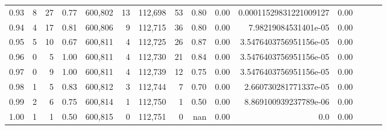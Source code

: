 \begin{tabular}{rrrrrrrrrrrrrrr}
0.93 &       8 &     27 &  0.77 &  600,802 &       13 &  112,698 &       53 &  0.80 &  0.00 &  0.00011529831221009127 &      0.00 \\
0.94 &       4 &     17 &  0.81 &  600,806 &        9 &  112,715 &       36 &  0.80 &  0.00 &    7.98219084531401e-05 &      0.00 \\
0.95 &       5 &     10 &  0.67 &  600,811 &        4 &  112,725 &       26 &  0.87 &  0.00 &  3.5476403756951156e-05 &      0.00 \\
0.96 &       0 &      5 &  1.00 &  600,811 &        4 &  112,730 &       21 &  0.84 &  0.00 &  3.5476403756951156e-05 &      0.00 \\
0.97 &       0 &      9 &  1.00 &  600,811 &        4 &  112,739 &       12 &  0.75 &  0.00 &  3.5476403756951156e-05 &      0.00 \\
0.98 &       1 &      5 &  0.83 &  600,812 &        3 &  112,744 &        7 &  0.70 &  0.00 &   2.660730281771337e-05 &      0.00 \\
0.99 &       2 &      6 &  0.75 &  600,814 &        1 &  112,750 &        1 &  0.50 &  0.00 &   8.869100939237789e-06 &      0.00 \\
1.00 &       1 &      1 &  0.50 &  600,815 &        0 &  112,751 &        0 &   nan &  0.00 &                     0.0 &      0.00 \\
\bottomrule
\end{tabular}
